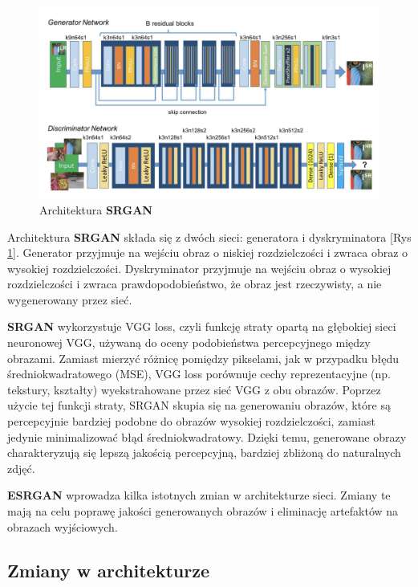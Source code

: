 \begin{figure}[ht]
    \centering
    \begin{minipage}[t]{0.85\linewidth}
        \includegraphics[width=\linewidth]{Rozdziały/04.ESRGAN/Obrazy/Architektura SRGAN.png}
        \caption{Architektura \textbf{SRGAN}}
        \label{fig:image62}
    \end{minipage}
\end{figure}

Architektura \textbf{SRGAN} składa się z dwóch sieci: generatora i dyskryminatora [Rys \ref{fig:image62}]. Generator przyjmuje na wejściu obraz o niskiej rozdzielczości i zwraca obraz o wysokiej rozdzielczości. Dyskryminator przyjmuje na wejściu obraz o wysokiej rozdzielczości i zwraca prawdopodobieństwo, że obraz jest rzeczywisty, a nie wygenerowany przez sieć. 

\textbf{SRGAN} wykorzystuje VGG loss, czyli funkcję straty opartą na głębokiej sieci neuronowej VGG, używaną do oceny podobieństwa percepcyjnego między obrazami. Zamiast mierzyć różnicę pomiędzy pikselami, jak w przypadku błędu średniokwadratowego (MSE), VGG loss porównuje cechy reprezentacyjne (np. tekstury, kształty) wyekstrahowane przez sieć VGG z obu obrazów. Poprzez użycie tej funkcji straty, SRGAN skupia się na generowaniu obrazów, które są percepcyjnie bardziej podobne do obrazów wysokiej rozdzielczości, zamiast jedynie minimalizować błąd średniokwadratowy. Dzięki temu, generowane obrazy charakteryzują się lepszą jakością percepcyjną, bardziej zbliżoną do naturalnych zdjęć.



\textbf{ESRGAN} wprowadza kilka istotnych zmian w architekturze sieci. Zmiany te mają na celu poprawę jakości generowanych obrazów i eliminację artefaktów na obrazach wyjściowych.


\subsection*{Zmiany w architekturze}

